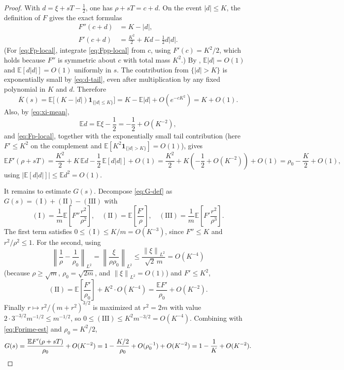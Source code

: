 \documentclass[11pt]{article}
\theoremstyle{plain}
\theoremstyle{definition}
\theoremstyle{remark}
\newcommand{\E}{\mathbb{E}}
\newcommand{\1}{\mathbf{1}}
\newcommand{\norm}[1]{\left\lVert #1\right\rVert}
\newcommand{\abs}[1]{\left\lvert #1\right\rvert}
\begin{document}
\begin{proof}
With $d=\xi+sT-\tfrac12$, one has $\rho+sT=c+d$. On the event
$\abs d\leq K$, the definition of $F$ gives the exact formulas
\begin{align}
    F''(c+d)&=K-\abs d,
    \label{eq:Fpp-local}\\
    F'(c+d)&=\frac{K^2}{2}+Kd-\frac12d\abs d.
    \label{eq:Fp-local}
\end{align}
(For \eqref{eq:Fp-local}, integrate \eqref{eq:Fpp-local} from $c$, using
$F'(c)=K^2/2$, which holds because $F''$ is symmetric about $c$ with total
mass $K^2$.) By , $\E\abs d=O(1)$ and $\E[d\abs d]=O(1)$
uniformly in $s$. The contribution from $\{\abs d>K\}$ is exponentially small
by \eqref{eq:d-tail}, even after multiplication by any fixed polynomial in
$K$ and $d$. Therefore
\[
    \overline K(s)
    =\E\bigl[(K-\abs d)\1_{\{\abs d\le K\}}\bigr]
    =K-\E\abs d+O(e^{-cK^2})=K+O(1).
\]
Also, by \eqref{eq:xi-mean},
\[
    \E d
    =
    \E\xi-\frac12
    =
    -\frac12+O(K^{-2}),
\]
and \eqref{eq:Fp-local}, together with the exponentially small tail
contribution (here $F'\leq K^2$ on the complement and
$\E[K^2\1_{\{\abs d>K\}}]=O(1)$), gives
\[
    \E F'(\rho+sT)
    =
    \frac{K^2}{2}
    +
    K\,\E d
    -
    \frac12\,\E[d\abs d]
    +
    O(1)
    =
    \frac{K^2}{2}
    +
    K\left(-\frac12+O(K^{-2})\right)
    +
    O(1)
    =
    \rho_0-\frac K2+O(1),
\]
using $\abs{\E[d\abs d]}\leq\E d^2=O(1)$.

It remains to estimate $G(s)$. Decompose \eqref{eq:G-def} as
$G(s)=(\mathrm I)+(\mathrm{II})-(\mathrm{III})$ with
\[
    (\mathrm I)=\frac1m\E\!\left[F''\frac{r^2}{\rho^2}\right],
    \quad
    (\mathrm{II})=\E\!\left[\frac{F'}{\rho}\right],
    \quad
    (\mathrm{III})=\frac1m\E\!\left[F'\frac{r^2}{\rho^3}\right].
\]
The first term satisfies $0\le(\mathrm I)\leq K/m=O(K^{-3})$, since
$F''\leq K$ and $r^2/\rho^2\leq1$. For the second, using
\[
    \left\|
        \frac1\rho-\frac1{\rho_0}
    \right\|_{L^2}
    =
    \left\|
        \frac{\xi}{\rho\rho_0}
    \right\|_{L^2}
    \le\frac{\norm\xi_{L^2}}{\sqrt2\,m}
    =
    O(K^{-4})
\]
(because $\rho\ge\sqrt m$, $\rho_0=\sqrt{2m}$, and $\norm\xi_{L^2}=O(1)$) and
$F'\leq K^2$,
\[
    (\mathrm{II})
    =
    \E\!\left[\frac{F'}{\rho_0}\right]
    +
    K^2\cdot O(K^{-4})
    =
    \frac{\E F'}{\rho_0}
    +
    O(K^{-2}).
\]
Finally $r\mapsto r^2/(m+r^2)^{3/2}$ is maximized at $r^2=2m$ with value
$2\cdot3^{-3/2}m^{-1/2}\leq m^{-1/2}$, so
$0\le(\mathrm{III})\leq K^2m^{-3/2}=O(K^{-4})$. Combining with
\eqref{eq:Fprime-est} and $\rho_0=K^2/2$,
\[
    G(s)
    =
    \frac{\E F'(\rho+sT)}{\rho_0}
    +
    O(K^{-2})
    =
    1-\frac{K/2}{\rho_0}+O(\rho_0^{-1})+O(K^{-2})
    =
    1-\frac1K+O(K^{-2}).
    \qedhere
\]
\end{proof}
\end{document}
